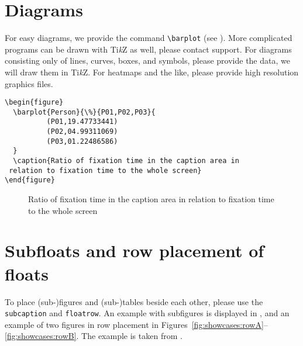 \section{Diagrams}

For easy diagrams, we provide the command \verb+\barplot+ (see ). More complicated programs can be drawn with Ti\textit{k}Z as well, please contact support. For diagrams consisting only of lines, curves, boxes, and symbols, please provide the data, we will draw them in Ti\textit{k}Z. For heatmaps and the like, please provide high resolution graphics files. 



\begin{verbatim}
\begin{figure} 
  \barplot{Person}{\%}{P01,P02,P03}{
	      (P01,19.47733441) 
	      (P02,04.99311069) 
	      (P03,01.22486586)
  }
  \caption{Ratio of fixation time in the caption area in
 relation to fixation time to the whole screen}
\end{figure}
\end{verbatim}

\begin{figure} 
  \caption{Ratio of fixation time in the caption area in relation to fixation time to the whole screen}
  \label{fig:barplot}
\end{figure}


\section{Subfloats and row placement of floats}
To place (sub-)figures and (sub-)tables beside each other, please use the \texttt{subcaption} and \texttt{floatrow}. An example with subfigures is displayed in , and an example of two figures in row placement in Figures~\ref{fig:showcases:rowA}--\ref{fig:showcases:rowB}. The example is taken from \textcite{Müller2021}.

